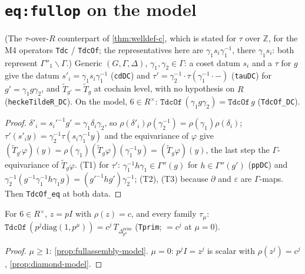 \section{\texttt{eq:fullop} on the model}

\begin{proposition}\label{prop:m5-tdc-dc}
  \leanok
  (The $\tau$-over-$R$ counterpart of \ref{thm:welldef-c}, which is stated for $\tau$ over $\mathbb Z$, for the M4 operators
  \texttt{Tdc} / \texttt{TdcOf}; the representatives here are $\gamma_1s_i\gamma_1^{-1}$, there $\gamma_1s_i$: both represent
  $\Gamma''_1\backslash\Gamma$.) Generic $(G,\Gamma,\Delta)$, $\gamma_1,\gamma_2\in\Gamma$: a coset datum $s_i$ and a $\tau$ for $g$ give the datum
  $s'_i=\gamma_1s_i\gamma_1^{-1}$ (\texttt{cdDC}) and $\tau'=\gamma_2^{-1}\cdot\tau(\gamma_1^{-1}\cdot{-})$ (\texttt{tauDC}) for
  $g'=\gamma_1g\gamma_2$, and $\widetilde T_{g'}=\widetilde T_g$ at cochain level, with no hypothesis on $R$
  (\texttt{heckeTildeR\_DC}). On the model, $6\in R^\times$: $\texttt{TdcOf}\,(\gamma_1g\gamma_2)=\texttt{TdcOf}\,g$
  (\texttt{TdcOf\_DC}).
\end{proposition}
\begin{proof}
  \leanok
  $\delta'_i=s_i'^{-1}g'=\gamma_1\delta_i\gamma_2$, so $\rho(\delta'_i)\rho(\gamma_2^{-1})=\rho(\gamma_1)\rho(\delta_i)$; $\tau'(s'_iy)=
  \gamma_2^{-1}\tau(s_i\gamma_1^{-1}y)$ and the equivariance of $\varphi$ give
  $(\widetilde T_{g'}\varphi)(y)=\rho(\gamma_1)(\widetilde T_g\varphi)(\gamma_1^{-1}y)=(\widetilde T_g\varphi)(y)$, the last step the
  $\Gamma$-equivariance of $\widetilde T_g\varphi$. (T1) for $\tau'$: $\gamma_1^{-1}h\gamma_1\in\Gamma''(g)$ for $h\in\Gamma''(g')$
  (\texttt{ppDC}) and $\gamma_2^{-1}(g^{-1}\gamma_1^{-1}h\gamma_1g)=(g'^{-1}hg')\gamma_2^{-1}$; (T2), (T3) because $\partial$ and
  $\varepsilon$ are $\Gamma$-maps. Then \texttt{TdcOf\_eq} at both data.
\end{proof}

\begin{lemma}\label{lem:m5-tdc-gd}
  \leanok
  For $6\in R^\times$, $z=pI$ with $\rho(z)=c$, and every family $\tau_\mu$:
  $\texttt{TdcOf}\,(p^j\mathrm{diag}(1,p^\mu))=c^j\,T_{\Delta^{\mathrm{prim}}_{p^\mu}}$ (\texttt{Tprim}; $=c^j$ at $\mu=0$).
\end{lemma}
\begin{proof}
  \leanok
  $\mu\ge1$: \ref{prop:fullassembly-model}. $\mu=0$: $p^jI=z^j$ is scalar with $\rho(z^j)=c^j$, \ref{prop:diamond-model}.
\end{proof}

